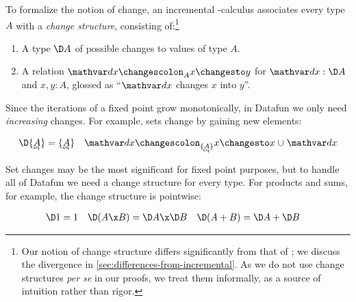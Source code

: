 To formalize the notion of change, an incremental \fn-calculus associates every
type $A$ with a \emph{change structure}, consisting of:\footnote{Our notion of
  change structure differs significantly from that of \citeauthor{incremental};
  we discuss the divergence in \cref{sec:differences-from-incremental}. As we do
  not use change structures \emph{per se} in our proofs, we treat them
  informally, as a source of intuition rather than rigor.}

\begin{enumerate}
\item A type $\D A$ of possible changes to values of type $A$.
\item A relation $\changesat{A}{\dx}{x}{y}$ for $\dx : \D A$ and $x,y : A$,
  glossed as ``$\dx$ changes $x$ into $y$''.
\end{enumerate}

\noindent
Since the iterations of a fixed point grow monotonically, in Datafun we only
need \emph{increasing} changes.
%
For example, sets change by gaining new elements:

\begin{align*}
  \D\tseteq{A} &= \tseteq{A}
  &
  \changesat{\tseteq{A}}{\dx}{x}{x \cup \dx}
\end{align*}

Set changes may be the most significant for fixed point purposes, but to handle
all of Datafun we need a change structure for every type. For products and sums,
for example, the change structure is pointwise:


\begin{align*}
  \D\tunit &= \tunit
  &
  \D(A \x B) &= \D A \x \D B
  &
  \D(A + B) &= \D A + \D B
\end{align*}

